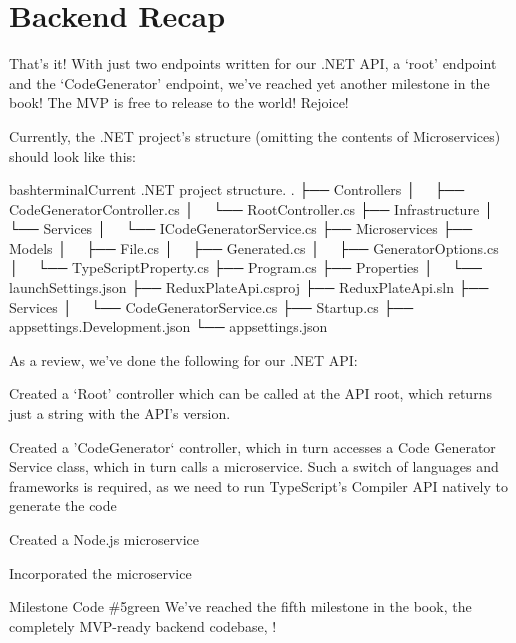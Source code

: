 \documentclass[a4paper,headinclude=on,footinclude=on,12pt,oneside]{scrbook}
\begin{document}
\section{Backend Recap}
 
That's it! With just two endpoints written for our .NET API, a `root' endpoint and the `CodeGenerator' endpoint, we've reached yet another milestone in the book! The MVP is free to release to the world! Rejoice!

Currently, the .NET project's structure (omitting the contents of Microservices) should look like this:

\begin{codeInput}{bash}{terminal}{Current .NET project structure.}
.
├── Controllers
│   ├── CodeGeneratorController.cs
│   └── RootController.cs
├── Infrastructure
│   └── Services
│       └── ICodeGeneratorService.cs
├── Microservices
├── Models
│   ├── File.cs
│   ├── Generated.cs
│   ├── GeneratorOptions.cs
│   └── TypeScriptProperty.cs
├── Program.cs
├── Properties
│   └── launchSettings.json
├── ReduxPlateApi.csproj
├── ReduxPlateApi.sln
├── Services
│   └── CodeGeneratorService.cs
├── Startup.cs
├── appsettings.Development.json
└── appsettings.json
\end{codeInput}

As a review, we've done the following for our .NET API:

\begin{arrows}
  \item Created a `Root' controller which can be called at the API root, which returns just a string with the API's version.
  \item Created a 'CodeGenerator` controller, which in turn accesses a Code Generator Service class, which in turn calls a microservice. Such a switch of languages and frameworks is required, as we need to run TypeScript's Compiler API natively to generate the code
  \item Created a Node.js microservice
  \item Incorporated the microservice 
\end{arrows}

\begin{highlightBox}{Milestone Code \#5}{green}{\greenCheck}
We've reached the fifth milestone in the book, the completely MVP-ready backend codebase, !
\end{highlightBox}
\end{document}
